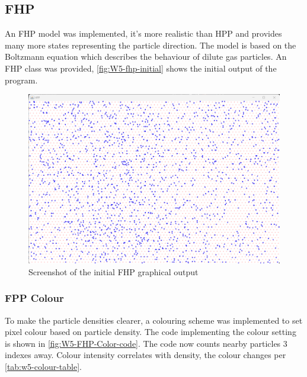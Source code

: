 \subsection{FHP}
An FHP model was implemented, it's more realistic than HPP and provides many more states representing the particle direction. The model is based on the Boltzmann equation which describes the behaviour of dilute gas particles. An FHP class was provided, \autoref{fig:W5-fhp-initial} shows the initial output of the program.


\begin{figure}[H] 
    \centering
    \includegraphics[width=0.9\columnwidth]{Figures/Week 5/FHP Initial Run .png}
    \caption{Screenshot of the initial FHP graphical output}
    \label{fig:W5-fhp-initial}
\end{figure}

\subsubsection{FPP Colour}
To make the particle densities clearer, a colouring scheme was implemented to set pixel colour based on particle density. The code implementing the colour setting is shown in \autoref{fig:W5-FHP-Color-code}. The code now counts nearby particles 3 indexes away. Colour intensity correlates with density, the colour changes per \autoref{tab:w5-colour-table}. 

